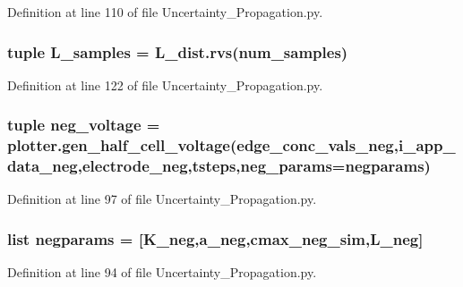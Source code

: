 Definition at line 110 of file Uncertainty\-\_\-\-Propagation.\-py.

\hypertarget{namespace_uncertainty___propagation_a506fed32170756c08599a57d9dde1788}{
\subsubsection[{L\-\_\-samples}]{\setlength{\rightskip}{0pt plus 5cm}tuple L\-\_\-samples = L\-\_\-dist.\-rvs({\bf num\-\_\-samples})}}\label{namespace_uncertainty___propagation_a506fed32170756c08599a57d9dde1788}


Definition at line 122 of file Uncertainty\-\_\-\-Propagation.\-py.

\hypertarget{namespace_uncertainty___propagation_ac1c3b11f280ede1816fa37e269c8d420}{
\subsubsection[{neg\-\_\-voltage}]{\setlength{\rightskip}{0pt plus 5cm}tuple neg\-\_\-voltage = {\bf plotter.\-gen\-\_\-half\-\_\-cell\-\_\-voltage}({\bf edge\-\_\-conc\-\_\-vals\-\_\-neg},{\bf i\-\_\-app\-\_\-data\-\_\-neg},electrode\-\_\-neg,tsteps,neg\-\_\-params={\bf negparams})}}\label{namespace_uncertainty___propagation_ac1c3b11f280ede1816fa37e269c8d420}


Definition at line 97 of file Uncertainty\-\_\-\-Propagation.\-py.

\hypertarget{namespace_uncertainty___propagation_ac8992e44d2fa887984bac92cc032cb5b}{
\subsubsection[{negparams}]{\setlength{\rightskip}{0pt plus 5cm}list negparams = \mbox{[}K\-\_\-neg,a\-\_\-neg,cmax\-\_\-neg\-\_\-sim,L\-\_\-neg\mbox{]}}}\label{namespace_uncertainty___propagation_ac8992e44d2fa887984bac92cc032cb5b}


Definition at line 94 of file Uncertainty\-\_\-\-Propagation.\-py.


